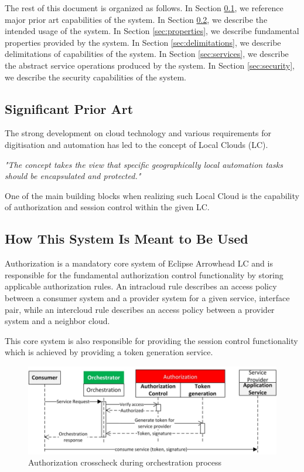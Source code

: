 \documentclass[a4paper]{arrowhead}
\begin{document}
The rest of this document is organized as follows.
In Section \ref{sec:prior_art}, we reference major prior art capabilities
of the system.
In Section \ref{sec:use}, we describe the intended usage of the system.
In Section \ref{sec:properties}, we describe fundamental properties
provided by the system.
In Section \ref{sec:delimitations}, we describe delimitations of capabilities
of the system.
In Section \ref{sec:services}, we describe the abstract service
operations produced by the system.
In Section \ref{sec:security}, we describe the security capabilities
of the system.

\subsection{Significant Prior Art}
\label{sec:prior_art}

The strong development on cloud technology and various requirements for digitisation and automation has led to the concept of Local Clouds (LC).

\textit{"The concept takes the view that specific geographically local automation tasks should be encapsulated and protected."} \cite{jerker2017localclouds}

One of the main building blocks when realizing such Local Cloud is the capability of authorization and session control within the given LC.

\subsection{How This System Is Meant to Be Used}
\label{sec:use}

Authorization is a mandatory core system of Eclipse Arrowhead LC and is responsible for the fundamental authorization control functionality by storing applicable authorization rules. An intracloud rule describes an access policy between a consumer system and a provider system for a given service, interface pair, while an intercloud rule describes an access policy between a provider system and a neighbor cloud.

This core system is also responsible for providing the session control functionality which is achieved by providing a token generation service. 

\begin{figure}[h!]
  \centering
  \includegraphics[width=15cm]{figures/authorization_control.png}
  \caption{
   Authorization crosscheck during orchestration process
  }
  \label{fig:information_overview}
\end{figure}
\end{document}
